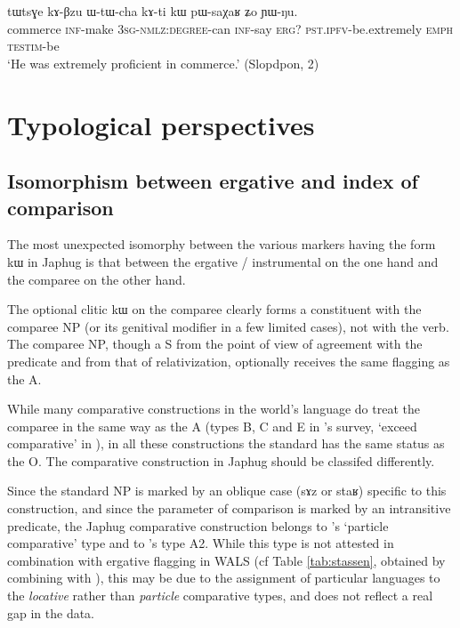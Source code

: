 \documentclass[oldfontcommands,oneside,a4paper,11pt]{article}
\newcommand{\ipa}[1]{{\phon #1}} %
\begin{document}
    \begin{exe}
  \ex  \label{ex:kAti.kW}  
  \gll
\ipa{tɯtsɣe}  	\ipa{kɤ-βzu}  	\ipa{ɯ-tɯ-cha}  	\ipa{kɤ-ti}  	\ipa{kɯ}  	\ipa{pɯ-saχaʁ}  	\ipa{ʑo}  	\ipa{ɲɯ-ŋu.}  \\
commerce \textsc{inf}-make \textsc{3sg-nmlz:degree}-can \textsc{inf}-say \textsc{erg?} \textsc{pst.ipfv}-be.extremely \textsc{emph} \textsc{testim}-be \\
\glt `He was extremely proficient in commerce.' (Slopdpon, 2)
   \end{exe} 
% 

 
%
%
%
 
 
 
 
\section{Typological perspectives}

\subsection{Isomorphism between ergative and index of comparison}
The most unexpected isomorphy between the various markers having the form \ipa{kɯ} in Japhug is that between the ergative / instrumental on the one hand and the comparee on the other hand.   

The optional clitic \ipa{kɯ} on the comparee  clearly forms a constituent with the comparee NP (or its genitival modifier in a few limited cases), not with the verb. The comparee NP, though a S from the point of view of agreement with the predicate and from that of relativization, optionally receives  the same flagging as the A.

 
While many comparative constructions in the world's language do treat the comparee in the same way as the A (types B, C and E in \citealt[789]{dixon08comparative}'s survey, `exceed comparative' in  \citealt{stassen11comparative}), in all these constructions the standard has the same status as the O.  The comparative construction in Japhug should be classifed differently. 

Since the standard NP is marked by an oblique case (\ipa{sɤz} or \ipa{staʁ}) specific to this construction, and since the parameter of comparison is marked by an intransitive predicate, the Japhug comparative construction belongs to  \citet{stassen11comparative}'s `particle comparative' type and to \citealt[789]{dixon08comparative}'s type A2.  While this type is not attested in combination with  ergative flagging in WALS (cf Table \ref{tab:stassen}, obtained by combining \citealt{stassen11comparative} with \citealt{comrie11case}), this may be due to the assignment of particular languages to the \textit{locative} rather than \textit{particle}  comparative types, and does not reflect a real gap in the data.
\end{document}
